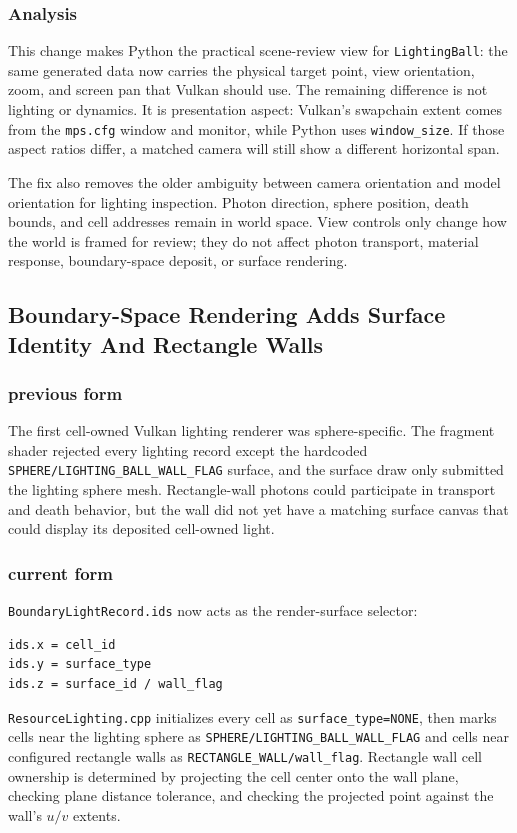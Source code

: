 \subsubsection{Analysis}

This change makes Python the practical scene-review view for
\texttt{LightingBall}: the same generated data now carries the physical target
point, view orientation, zoom, and screen pan that Vulkan should use.  The
remaining difference is not lighting or dynamics.  It is presentation aspect:
Vulkan's swapchain extent comes from the \texttt{mps.cfg} window and monitor,
while Python uses \texttt{window\_size}.  If those aspect ratios differ, a
matched camera will still show a different horizontal span.

The fix also removes the older ambiguity between camera orientation and model
orientation for lighting inspection.  Photon direction, sphere position,
death bounds, and cell addresses remain in world space.  View controls only
change how the world is framed for review; they do not affect photon
transport, material response, boundary-space deposit, or surface rendering.

\subsection{Boundary-Space Rendering Adds Surface Identity And Rectangle Walls}

\subsubsection{previous form}

The first cell-owned Vulkan lighting renderer was sphere-specific.  The
fragment shader rejected every lighting record except the hardcoded
\texttt{SPHERE/LIGHTING\_BALL\_WALL\_FLAG} surface, and the surface draw only
submitted the lighting sphere mesh.  Rectangle-wall photons could participate
in transport and death behavior, but the wall did not yet have a matching
surface canvas that could display its deposited cell-owned light.

\subsubsection{current form}

\texttt{BoundaryLightRecord.ids} now acts as the render-surface selector:
\begin{verbatim}
ids.x = cell_id
ids.y = surface_type
ids.z = surface_id / wall_flag
\end{verbatim}
\texttt{ResourceLighting.cpp} initializes every cell as
\texttt{surface\_type=NONE}, then marks cells near the lighting sphere as
\texttt{SPHERE/LIGHTING\_BALL\_WALL\_FLAG} and cells near configured
rectangle walls as \texttt{RECTANGLE\_WALL/wall\_flag}.  Rectangle wall cell
ownership is determined by projecting the cell center onto the wall plane,
checking plane distance tolerance, and checking the projected point against
the wall's \(u/v\) extents.

